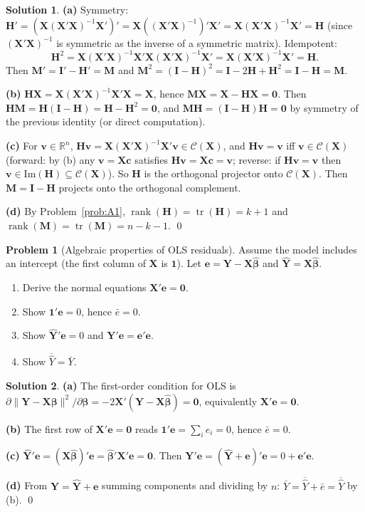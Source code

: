 \documentclass[12pt,a4paper]{article}
\theoremstyle{definition}
\newtheorem{exercise}{Problem}
\newtheorem*{solution*}{Solution}
\DeclareMathOperator\tr{tr}
\DeclareMathOperator\rank{rank}
\newcommand{\bX}{\mathbf{X}}
\newcommand{\bY}{\mathbf{Y}}
\def\bb{\boldsymbol{\beta}}
\newcommand{\bI}{\mathbf{I}}
\newcommand{\bH}{\mathbf{H}}
\newcommand{\bM}{\mathbf{M}}
\def\bc{\mathbf{c}}
\newcommand{\bone}{\mathbf{1}}
\newcommand{\bzero}{\mathbf{0}}
\newcommand{\bv}{\mathbf{v}}
\newcommand{\Real}{\mathbb{R}}
\newcommand{\calC}{\mathcal{C}}
\begin{document}
\begin{solution*}
\textbf{(a)} Symmetry: $\bH' = (\bX(\bX'\bX)^{-1}\bX')' = \bX((\bX'\bX)^{-1})'\bX' = \bX(\bX'\bX)^{-1}\bX' = \bH$ (since $(\bX'\bX)^{-1}$ is symmetric as the inverse of a symmetric matrix). Idempotent:
\[
\bH^2 = \bX(\bX'\bX)^{-1}\bX'\bX(\bX'\bX)^{-1}\bX' = \bX(\bX'\bX)^{-1}\bX' = \bH.
\]
Then $\bM' = \bI' - \bH' = \bM$ and $\bM^2 = (\bI-\bH)^2 = \bI - 2\bH + \bH^2 = \bI - \bH = \bM$.

\textbf{(b)} $\bH\bX = \bX(\bX'\bX)^{-1}\bX'\bX = \bX$, hence $\bM\bX = \bX - \bH\bX = \bzero$. Then $\bH\bM = \bH(\bI-\bH) = \bH - \bH^2 = \bzero$, and $\bM\bH = (\bI-\bH)\bH = \bzero$ by symmetry of the previous identity (or direct computation).

\textbf{(c)} For $\bv \in \Real^n$, $\bH\bv = \bX(\bX'\bX)^{-1}\bX'\bv \in \calC(\bX)$, and $\bH\bv = \bv$ iff $\bv \in \calC(\bX)$ (forward: by (b) any $\bv = \bX\bc$ satisfies $\bH\bv = \bX\bc = \bv$; reverse: if $\bH\bv = \bv$ then $\bv \in \mathrm{Im}(\bH) \subseteq \calC(\bX)$). So $\bH$ is the orthogonal projector onto $\calC(\bX)$. Then $\bM = \bI - \bH$ projects onto the orthogonal complement.

\textbf{(d)} By Problem~\ref{prob:A1}, $\rank(\bH) = \tr(\bH) = k+1$ and $\rank(\bM) = \tr(\bM) = n-k-1$. \qed
\end{solution*}

\begin{exercise}[Algebraic properties of OLS residuals]\label{prob:A4}
Assume the model includes an intercept (the first column of $\bX$ is $\bone$). Let $\mathbf{e} = \bY - \bX\hat{\bb}$ and $\hat{\bY} = \bX\hat{\bb}$.
\begin{enumerate}[label=(\alph*),nosep]
\item Derive the normal equations $\bX'\mathbf{e} = \bzero$.
\item Show $\bone'\mathbf{e} = 0$, hence $\bar{e} = 0$.
\item Show $\hat{\bY}'\mathbf{e} = 0$ and $\bY'\mathbf{e} = \mathbf{e}'\mathbf{e}$.
\item Show $\overline{\hat{Y}} = \bar Y$.
\end{enumerate}
\end{exercise}

\begin{solution*}
\textbf{(a)} The first-order condition for OLS is $\partial\|\bY-\bX\bb\|^2/\partial\bb = -2\bX'(\bY - \bX\hat{\bb}) = \bzero$, equivalently $\bX'\mathbf{e} = \bzero$.

\textbf{(b)} The first row of $\bX'\mathbf{e} = \bzero$ reads $\bone'\mathbf{e} = \sum_i e_i = 0$, hence $\bar e = 0$.

\textbf{(c)} $\hat{\bY}'\mathbf{e} = (\bX\hat{\bb})'\mathbf{e} = \hat{\bb}'\bX'\mathbf{e} = \bzero$. Then $\bY'\mathbf{e} = (\hat{\bY} + \mathbf{e})'\mathbf{e} = 0 + \mathbf{e}'\mathbf{e}$.

\textbf{(d)} From $\bY = \hat{\bY} + \mathbf{e}$ summing components and dividing by $n$: $\bar Y = \overline{\hat{Y}} + \bar e = \overline{\hat{Y}}$ by (b). \qed
\end{solution*}
\end{document}
